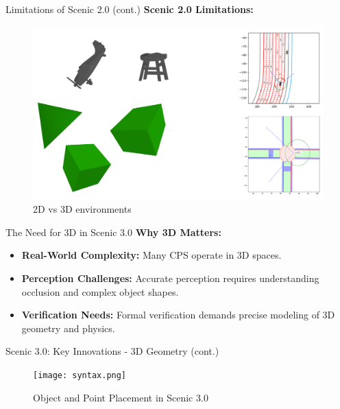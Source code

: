 \documentclass{beamer}
\begin{document}
\begin{frame}{Limitations of Scenic 2.0 (cont.)}  
    \textbf{Scenic 2.0 Limitations:}
    \begin{figure}
        \centering
        \includegraphics[width=1\linewidth]{2D_vs_3D.png}
        \caption{2D vs 3D environments}
        \label{fig:2d-vs-3d}
    \end{figure}

\end{frame}

\begin{frame}{The Need for 3D in Scenic 3.0}
    \textbf{Why 3D Matters:}\\
    \begin{itemize}
        \setlength{\itemindent}{-1em} 
        \item \textbf{Real-World Complexity:} Many CPS operate in 3D spaces.
        \item \textbf{Perception Challenges:} Accurate perception requires understanding occlusion and complex object shapes.
        \item \textbf{Verification Needs:} Formal verification demands precise modeling of 3D geometry and physics.
    \end{itemize}
\end{frame}


\begin{frame}{Scenic 3.0: Key Innovations - 3D Geometry (cont.)}
\begin{figure}
\centering
\texttt{[image: syntax.png]}
\caption{Object and Point Placement in Scenic 3.0}
\label{fig:syntax}
\end{figure}
\end{frame}
\end{document}
